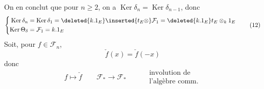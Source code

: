 On en conclut que pour $n\geq2$, on a $\operatorname{Ker}\delta_n=\operatorname{Ker}\delta_{n-1}$, donc
\[
\left\{\begin{aligned}
\operatorname{Ker}\delta_n&=\operatorname{Ker}\delta_1=\deleted{k.1_E}\inserted{t_E\otimes}\mathcal F_1=\deleted{k.1_E}t_E\otimes_k1_E\\
\operatorname{Ker}\Theta_\delta&=\mathcal F_1=k.1_E
\end{aligned}\right.\tag*{(12)}
\]
Soit, pour $f\in\mathcal F_n$,
\[
\check f(x)=\check f(-x)\tag*{(13)}
\]
donc
\[
f\longmapsto\check f\qquad \mathcal F_*\longrightarrow\mathcal F_*
\qquad\begin{aligned}&\text{involution de}\\&\text{l'algèbre comm.}\end{aligned}\tag*{(14)}
\]
